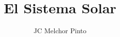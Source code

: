 \documentclass[12pt,addpoints,answers]{guia}
\title{El Sistema Solar}
\author{JC Melchor Pinto}
\begin{document}
\INFO%
\begin{questions}
    \questionboxed[25]{}
    \questionboxed[25]{}
\end{questions}
\end{document}
